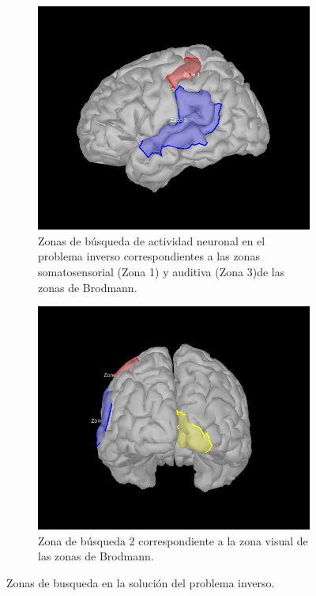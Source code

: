 \begin{figure}[tb]
\centering
    \begin{subfigure}[t]{0.49\textwidth}
        \includegraphics[width=\textwidth]{gfx/zone_1-2.png}
        \caption{Zonas de búsqueda de actividad neuronal en el problema inverso correspondientes a las zonas somatosensorial (Zona 1) y auditiva (Zona 3)de las zonas de Brodmann.}
        \label{fig:zone1-2}
    \end{subfigure}
	\hfill
    \begin{subfigure}[t]{0.49\textwidth}
        \includegraphics[width=\textwidth]{gfx/zone_3.png}
        \caption{Zona de búsqueda 2 correspondiente a la zona visual de las zonas de Brodmann.}
        \label{fig:zone3}
    \end{subfigure}
    \caption{Zonas de busqueda en la solución del problema inverso.}
    \label{fig:dipoles-zones}
\end{figure}

